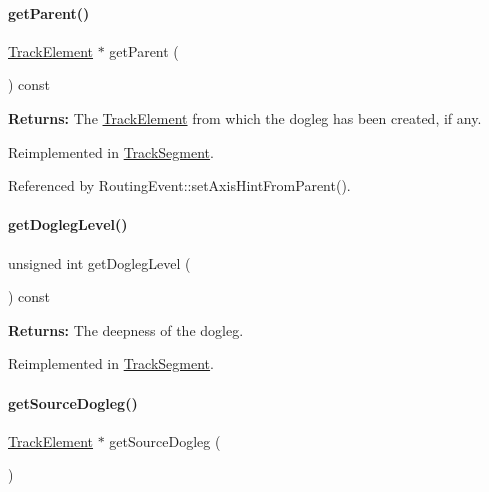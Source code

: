 \paragraph{\texorpdfstring{get\+Parent()}{getParent()}}
{\footnotesize\ttfamily \mbox{\hyperlink{classKite_1_1TrackElement}{Track\+Element}} $\ast$ get\+Parent (\begin{DoxyParamCaption}{ }\end{DoxyParamCaption}) const\hspace{0.3cm}{\ttfamily [virtual]}}

{\bfseries Returns\+:} The \mbox{\hyperlink{classKite_1_1TrackElement}{Track\+Element}} from which the dogleg has been created, if any. 

Reimplemented in \mbox{\hyperlink{classKite_1_1TrackSegment_a95ec3b8e7e1ec87c20ee0b37bcc96df7}{Track\+Segment}}.



Referenced by Routing\+Event\+::set\+Axis\+Hint\+From\+Parent().

\mbox{\label{classKite_1_1TrackElement_add78c6f914788c549f144998caacda84}} 
\paragraph{\texorpdfstring{get\+Dogleg\+Level()}{getDoglegLevel()}}
{\footnotesize\ttfamily unsigned int get\+Dogleg\+Level (\begin{DoxyParamCaption}{ }\end{DoxyParamCaption}) const\hspace{0.3cm}{\ttfamily [virtual]}}

{\bfseries Returns\+:} The deepness of the dogleg. 

Reimplemented in \mbox{\hyperlink{classKite_1_1TrackSegment_add78c6f914788c549f144998caacda84}{Track\+Segment}}.

\mbox{\label{classKite_1_1TrackElement_a7e79fbfe77f173d46b1959c41087930a}} 
\paragraph{\texorpdfstring{get\+Source\+Dogleg()}{getSourceDogleg()}}
{\footnotesize\ttfamily \mbox{\hyperlink{classKite_1_1TrackElement}{Track\+Element}} $\ast$ get\+Source\+Dogleg (\begin{DoxyParamCaption}{ }\end{DoxyParamCaption})\hspace{0.3cm}{\ttfamily [virtual]}}

